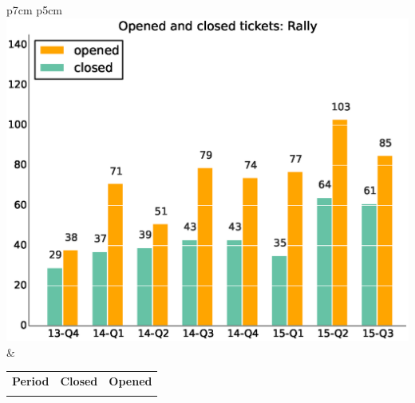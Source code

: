 \documentclass[a4wide,11pt]{article}
\begin{document}
\begin{tabular}{p{7cm} p{5cm}}
    \vspace{0pt} 
    \includegraphics[scale=.35]{figs/closedRally.eps}
    & 
    \vspace{0pt}
    \begin{tabular}{l|r|r|}%
    \bfseries Period & \bfseries Closed & \bfseries Opened
    \csvreader[head to column names]{data/closedRally.csv}{}%
    {\\ & \closed & \opened}
    \end{tabular}
\end{tabular}
\end{document}
